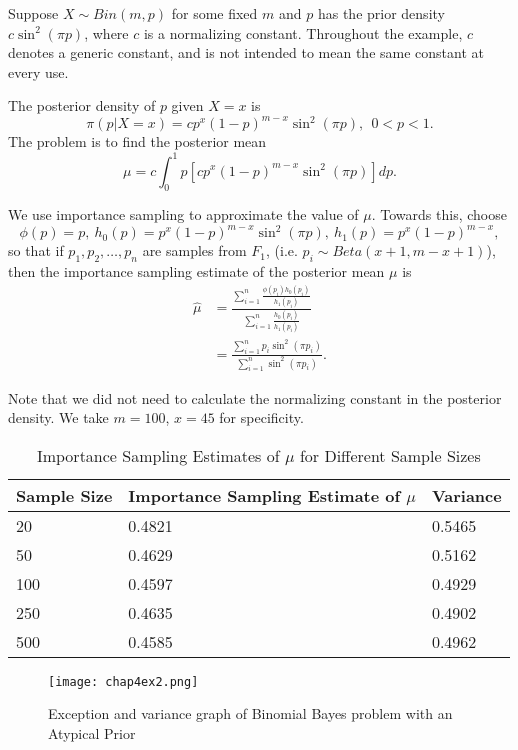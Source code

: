 \begin{example}
	\label{Binomial Bayes problem with an Atypical Prior}
	Suppose $X\sim Bin(m,p)$ for some fixed $m$ and $p$ has the prior density $c\sin^{2}(\pi p)$,
	where $c$ is a normalizing constant.
	Throughout the example, $c$ denotes a generic constant,
	and is not intended to mean the same constant at every use.

	The posterior density of $p$ given $X = x$ is
	\[
		\pi(p|X=x) = cp^{x}(1-p)^{m-x}\sin ^{2}(\pi p), \ \ 0<p<1.
	\]
	The problem is to find the posterior mean
	\[
		\mu = c \int_{0}^{1} p[cp^{x}(1-p)^{m-x}\sin ^{2}(\pi p)]dp.
	\]

	We use importance sampling to approximate the value of $\mu$. Towards this, choose
	\[
		\phi(p)=p, \ h_0(p) = p^{x} (1-p)^{m-x} \sin ^{2}(\pi p),\ h_1(p) = p^{x}(1-p)^{m-x},
	\]
	so that if $p_1,p_2,\ldots,p_n$ are samples from $F_1$, (i.e. $p_i\sim Beta(x+1, m-x+1)$),
	then the importance sampling estimate of the posterior mean $\mu$ is
	\begin{align*}
		\hat{\mu} & = \frac{\sum_{i=1}^{n}\frac{\phi(p_i)h_0(p_i)}{h_1(p_i)} }{\sum_{i=1}^{n}\frac{h_0(p_i)}{h_1(p_i)} } \\
		          & = \frac{\sum_{i=1}^{n}p_i\sin ^{2}(\pi p_i) }{\sum_{i=1}^{n} \sin ^{2}(\pi p_i) }.
	\end{align*}

	Note that we did not need to calculate the normalizing constant in the posterior density.
	We take $m=100$, $x=45$ for specificity.
	\begin{table}[H]
		\centering
		\begin{tabular}{l p{4.5cm} p{2cm}}
			\hline
			Sample Size & Importance Sampling Estimate of $\mu$ & Variance \\
			\hline
			20          & 0.4821                                & 0.5465   \\
			50          & 0.4629                                & 0.5162   \\
			100         & 0.4597                                & 0.4929   \\
			250         & 0.4635                                & 0.4902   \\
			500         & 0.4585                                & 0.4962   \\
			\hline
		\end{tabular}
		\caption{Importance Sampling Estimates of $\mu$ for Different Sample Sizes}
		\label{tab:importance-sampling-mu}
	\end{table}
    \begin{figure}[H]
        \centering
        \texttt{[image: chap4ex2.png]}
        \caption{Exception and variance graph of Binomial Bayes problem with an Atypical Prior}
    \end{figure}
\end{example}

